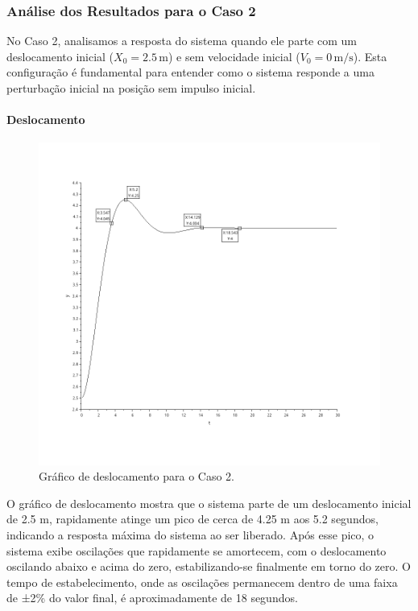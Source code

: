 \subsubsection{Análise dos Resultados para o Caso 2}
No Caso 2, analisamos a resposta do sistema quando ele parte com um deslocamento inicial (\(X_0 = 2.5 \, \text{m}\)) e sem velocidade inicial (\(V_0 = 0 \, \text{m/s}\)). Esta configuração é fundamental para entender como o sistema responde a uma perturbação inicial na posição sem impulso inicial.

\paragraph{Deslocamento}
\begin{figure}[H]
    \centering
    \includegraphics[height=0.7\textwidth]{atividades/2-atividade/assets/deslocamento-caso-2.png}
    \caption{Gráfico de deslocamento para o Caso 2.}
\end{figure}
O gráfico de deslocamento mostra que o sistema parte de um deslocamento inicial de 2.5 m, rapidamente atinge um pico de cerca de 4.25 m aos 5.2 segundos, indicando a resposta máxima do sistema ao ser liberado. Após esse pico, o sistema exibe oscilações que rapidamente se amortecem, com o deslocamento oscilando abaixo e acima do zero, estabilizando-se finalmente em torno do zero. O tempo de estabelecimento, onde as oscilações permanecem dentro de uma faixa de ±2\% do valor final, é aproximadamente de 18 segundos.

